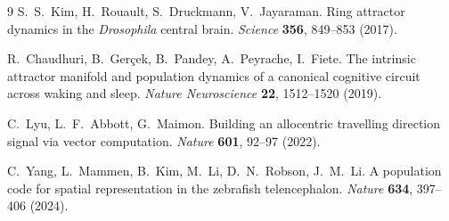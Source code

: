 \documentclass[11pt]{article}
\begin{document}
\begin{thebibliography}{9}
S.~S.~Kim, H.~Rouault, S.~Druckmann, V.~Jayaraman.
Ring attractor dynamics in the \emph{Drosophila} central brain.
\emph{Science} \textbf{356}, 849--853 (2017).

R.~Chaudhuri, B.~Ger\c{c}ek, B.~Pandey, A.~Peyrache, I.~Fiete.
The intrinsic attractor manifold and population dynamics of a canonical
cognitive circuit across waking and sleep. \emph{Nature Neuroscience}
\textbf{22}, 1512--1520 (2019).

C.~Lyu, L.~F.~Abbott, G.~Maimon.
Building an allocentric travelling direction signal via vector
computation. \emph{Nature} \textbf{601}, 92--97 (2022).

C.~Yang, L.~Mammen, B.~Kim, M.~Li, D.~N.~Robson, J.~M.~Li.
A population code for spatial representation in the zebrafish
telencephalon. \emph{Nature} \textbf{634}, 397--406 (2024).

\end{thebibliography}
\end{document}
